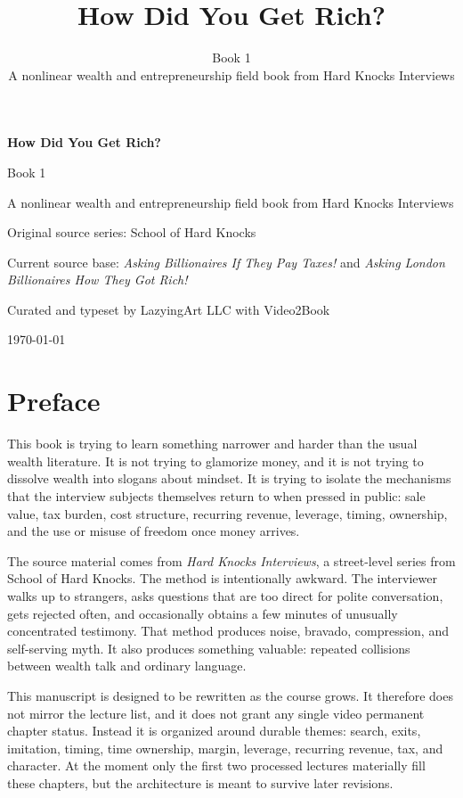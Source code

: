 \documentclass[11pt,oneside]{book}
\title{How Did You Get Rich?}
\author{Book 1 \\ A nonlinear wealth and entrepreneurship field book from Hard Knocks Interviews}
\date{}
\begin{document}
\frontmatter

\begin{titlepage}
\centering
\vspace*{2cm}
{\Huge\bfseries How Did You Get Rich?\par}
\vspace{0.7cm}
{\Large Book 1\par}
\vspace{0.3cm}
{\large A nonlinear wealth and entrepreneurship field book from Hard Knocks Interviews\par}
\vspace{1.4cm}
{\large Original source series: School of Hard Knocks\par}
\vspace{0.4cm}
{\large Current source base: \emph{Asking Billionaires If They Pay Taxes!} and \emph{Asking London Billionaires How They Got Rich!}\par}
\vfill
{\large Curated and typeset by LazyingArt LLC with Video2Book\par}
\vspace{0.5cm}
{\large \today\par}
\end{titlepage}

\chapter*{Preface}

This book is trying to learn something narrower and harder than the usual wealth literature. It is not trying to glamorize money, and it is not trying to dissolve wealth into slogans about mindset. It is trying to isolate the mechanisms that the interview subjects themselves return to when pressed in public: sale value, tax burden, cost structure, recurring revenue, leverage, timing, ownership, and the use or misuse of freedom once money arrives.

The source material comes from \emph{Hard Knocks Interviews}, a street-level series from School of Hard Knocks. The method is intentionally awkward. The interviewer walks up to strangers, asks questions that are too direct for polite conversation, gets rejected often, and occasionally obtains a few minutes of unusually concentrated testimony. That method produces noise, bravado, compression, and self-serving myth. It also produces something valuable: repeated collisions between wealth talk and ordinary language.

This manuscript is designed to be rewritten as the course grows. It therefore does not mirror the lecture list, and it does not grant any single video permanent chapter status. Instead it is organized around durable themes: search, exits, imitation, timing, time ownership, margin, leverage, recurring revenue, tax, and character. At the moment only the first two processed lectures materially fill these chapters, but the architecture is meant to survive later revisions.
\end{document}
